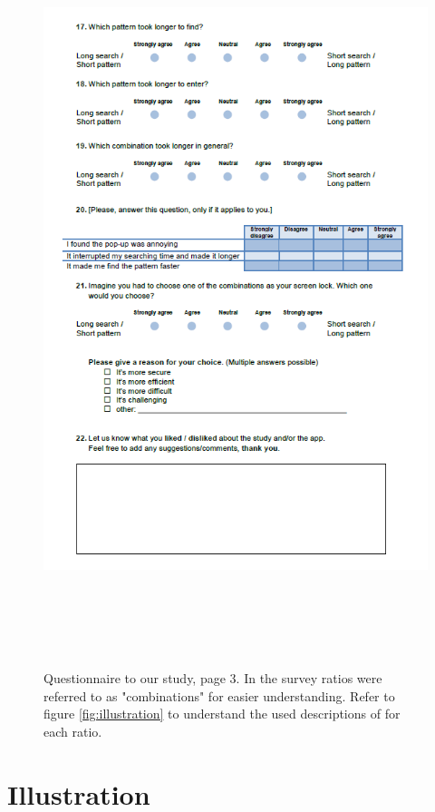 \begin{figure}[H]
\includegraphics[width=15cm, height=22cm]{Chapters/graphics/survey3.PNG}
\caption{Questionnaire to our study, page 3. In the survey ratios were referred to as "combinations" for easier understanding. Refer to figure \ref{fig:illustration} to understand the used descriptions of for each ratio.}
\label{fig:survey3}
\end{figure}

\section{Illustration}

